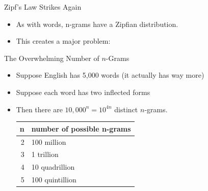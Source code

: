\documentclass[professionalfonts, xcolor={usenames,svgnames,x11names,table}]{beamer}
\begin{document}
\begin{frame}{Zipf's Law Strikes Again}
    \begin{itemize}
        \item As with words, n-grams have a Zipfian distribution.
        \item This creates a major problem: 
    \end{itemize}

    \begin{block}{The Overwhelming Number of $n$-Grams}
        \begin{itemize}
            \item Suppose English has 5,000 words (it actually has way more)
            \item Suppose each word has two inflected forms\\
            \item Then there are $10,000^n = 10^{4n}$ distinct $n$-grams.
                \begin{center}
                    \begin{tabular}{rl}
                        \toprule
                        \textbf{n} & \textbf{number of possible n-grams}\\
                        \midrule
                        2 & 100 million\\
                        3 & 1 trillion\\
                        4 & 10 quadrillion\\
                        5 & 100 quintillion\\
                        \bottomrule
                    \end{tabular}
                \end{center}
        \end{itemize}
    \end{block}
\end{frame}
\end{document}
